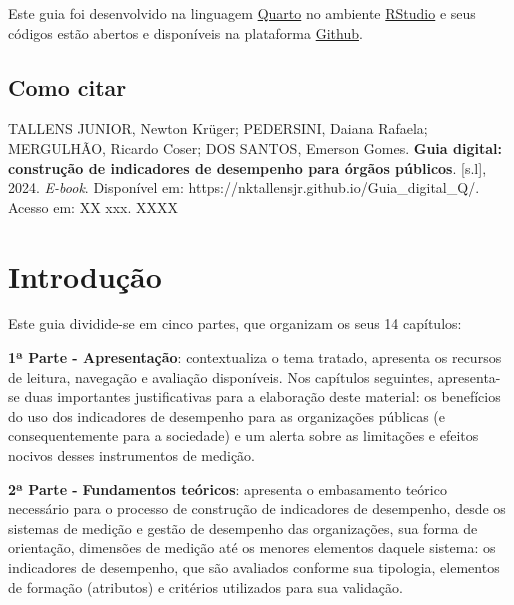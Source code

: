 \documentclass[
  letterpaper,
  DIV=11,
  numbers=noendperiod]{scrreprt}
\begin{document}

Este guia foi desenvolvido na linguagem
\href{https://quarto.org/}{Quarto} no ambiente
\href{https://posit.co/products/open-source/rstudio/}{RStudio} e seus
códigos estão abertos e disponíveis na plataforma
\href{https://github.com/}{Github}.

\hypertarget{como-citar}{%
\section*{Como citar}\label{como-citar}}


TALLENS JUNIOR, Newton Krüger; PEDERSINI, Daiana Rafaela; MERGULHÃO,
Ricardo Coser; DOS SANTOS, Emerson Gomes. \textbf{Guia digital:
construção de indicadores de desempenho para órgãos públicos}.
{[}s.l{]}, 2024. \emph{E-book}. Disponível em:
https://nktallensjr.github.io/Guia\_digital\_Q/. Acesso em: XX xxx. XXXX


\hypertarget{introduuxe7uxe3o}{%
\chapter*{Introdução}\label{introduuxe7uxe3o}}


Este guia dividide-se em cinco partes, que organizam os seus 14
capítulos:

\textbf{1ª Parte - Apresentação}: contextualiza o tema tratado,
apresenta os recursos de leitura, navegação e avaliação disponíveis. Nos
capítulos seguintes, apresenta-se duas importantes justificativas para a
elaboração deste material: os benefícios do uso dos indicadores de
desempenho para as organizações públicas (e consequentemente para a
sociedade) e um alerta sobre as limitações e efeitos nocivos desses
instrumentos de medição.

\textbf{2ª Parte -} \textbf{Fundamentos teóricos}: apresenta o
embasamento teórico necessário para o processo de construção de
indicadores de desempenho, desde os sistemas de medição e gestão de
desempenho das organizações, sua forma de orientação, dimensões de
medição até os menores elementos daquele sistema: os indicadores de
desempenho, que são avaliados conforme sua tipologia, elementos de
formação (atributos) e critérios utilizados para sua validação.
\end{document}

